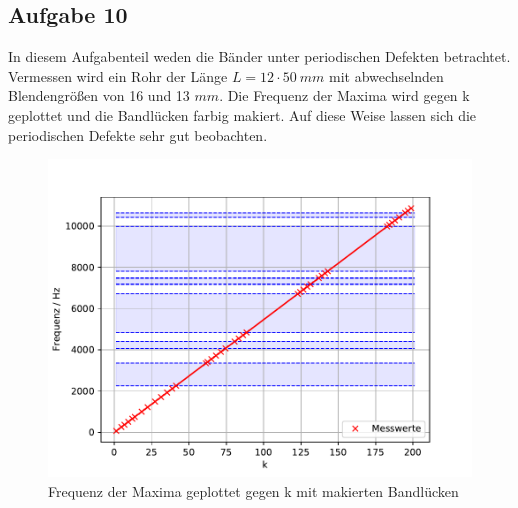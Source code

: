 \subsection{Aufgabe 10}
In diesem Aufgabenteil weden die Bänder unter periodischen Defekten betrachtet.
Vermessen wird ein Rohr der Länge $L=12 \cdot \SI{50}{mm}$ mit abwechselnden Blendengrößen von 16 und 13 $\si{mm}$.
Die Frequenz der Maxima wird gegen k geplottet und die Bandlücken farbig makiert.
Auf diese Weise lassen sich die periodischen Defekte sehr gut beobachten.
\begin{figure}[h!]
  \centering
  \includegraphics[width=1\textwidth]{A101.pdf}
  \caption{Frequenz der Maxima geplottet gegen k mit makierten Bandlücken}
  \label{fig.Aufgabe101}
\end{figure}
  \FloatBarrier

